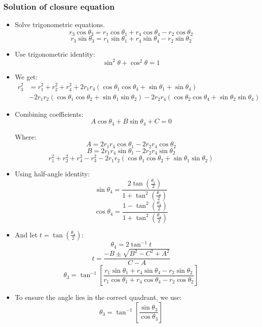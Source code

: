 \documentclass[11pt]{article}
\begin{document}
\subsubsection{Solution of closure equation}
\label{sec:orgf06df44}
\begin{itemize}
\item Solve trigonometric equations.
\[r_3 \cos \theta_3 = r_1 \cos \theta_1 + r_4 \cos \theta_4 - r_2 \cos \theta_2\]
\[r_3 \sin \theta_3 = r_1 \sin \theta_1 + r_4 \sin \theta_4 - r_2 \sin \theta_2\]
\item Use trigonometric identity:
\[\sin^2 \theta + \cos^2 \theta = 1\]
\item We get:
\begin{align*}
r_3^2 &= r_1^2 + r_2^2 + r_4^2 + 2r_1 r_4 (\cos \theta_1 \cos \theta_4 + \sin \theta_1 + \sin \theta_4) \\
&- 2r_1 r_2 (\cos \theta_1 \cos \theta_2 + \sin \theta_1 \sin \theta_2) - 2r_2 r_4 (\cos \theta_2 \cos \theta_4 + \sin \theta_2 \sin \theta_4)
\end{align*}
\item Combining coefficients:
\[A \cos \theta_4 + B \sin \theta_4 + C = 0\]

Where:
\[A = 2r_1 r_4 \cos \theta_1 - 2r_2 r_4 \cos \theta_2\]
\[B = 2r_1 r_4 \sin \theta_1 - 2r_2 r_4 \sin \theta_2\]
\[r_1^2 + r_2^2 + r_4^2 - r_3^2 - 2r_1 r_2 (\cos \theta_1 \cos \theta_2 + \sin \theta_1 \sin \theta_2)\]
\item Using half-angle identity:
\[\sin \theta_4 = \frac{2 \tan \left(\frac{\theta_4}{2} \right)}{1 + \tan^2 \left(\frac{\theta_4}{2} \right)}\]
\[\cos \theta_4 = \frac{1 - \tan^2 \left(\frac{\theta_4}{2} \right)}{1 + \tan^2 \left(\frac{\theta_4}{2} \right)}\]
\item And let \(t = \tan \left(\frac{\theta_4}{2} \right)\):
\[\theta_4 = 2 \tan^{-1} t\]
\[t = \frac{-B \pm \sqrt{B^2 - C^2 + A^2}}{C - A}\]
\[\theta_3 = \tan^{-1} \left[\frac{r_1 \sin \theta_1 + r_4 \sin \theta_4 - r_2 \sin \theta_2}{r_1 \cos \theta_1 + r_4 \cos \theta_4 - r_2 \cos \theta_2} \right]\]
\item To ensure the angle lies in the correct quadrant, we use:
\[\theta_3 = \tan^{-1} \left[\frac{\sin \theta_3}{\cos \theta_3} \right]\]
\end{itemize}
\end{document}
